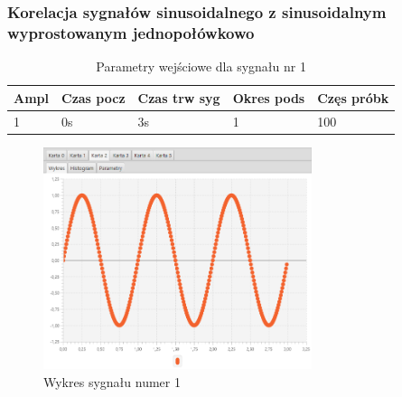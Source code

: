 \documentclass[12pt]{article}
\begin{document}
{{            \subsubsection{Korelacja sygnałów sinusoidalnego z sinusoidalnym wyprostowanym
            jednopołówkowo} \label{eksperyment:korelacja2}{

                \begin{table}[H]
                    \centering
                    \begin{tabular}{|l|l|l|l|l|}
                        \hline
                        Ampl & Czas pocz & Czas trw syg & Okres pods & Częs próbk   \\ \hline
                        1 & 0s & 3s & 1 & 100           \\ \hline
                    \end{tabular}
                    \caption{Parametry wejściowe dla sygnału nr 1}
                \end{table}
                \begin{figure}[H]
                    \centering
                    \includegraphics[width=0.7\textwidth]{img/result/correlation/experiment2/data_122746.png}
                    \caption{Wykres sygnału numer 1}
                \end{figure}

}}}
\end{document}
